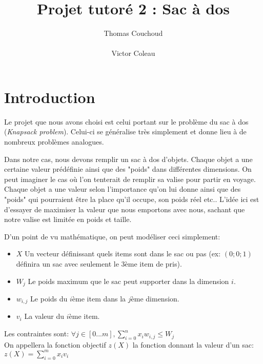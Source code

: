 \documentclass{EPUProjetPeiP}
\title[Projet sac à dos]{Projet tutoré 2 : Sac à dos}
\author{Thomas Couchoud\\
\noindent[\url{thomas.couchoud@etu.univ-tours.fr}]\\
Victor Coleau\\
\noindent[\url{victor.coleau@etu.univ-tours.fr}]}
\begin{document}
\maketitle

\setcounter{page}{0}
{
\setlength{\parskip}{0em}

\tableofcontents


}


\start

\chapter*{Introduction}
Le projet que nous avons choisi est celui portant sur le problème du sac à dos (\textit{Knapsack problem}). Celui-ci se généralise très simplement et donne lieu à de nombreux problèmes analogues.

Dans notre cas, nous devons remplir un sac à dos d'objets. Chaque objet a une certaine valeur prédéfinie ainsi que des "poids" dans différentes dimensions. On peut imaginer le cas où l'on tenterait de remplir sa valise pour partir en voyage. Chaque objet a une valeur selon l'importance qu'on lui donne ainsi que des "poids" qui pourraient être la place qu'il occupe, son poids réel etc.. L'idée ici est d'essayer de maximiser la valeur que nous emportons avec nous, sachant que notre valise est limitée en poids et taille.

D'un point de vu mathématique, on peut modéliser ceci simplement:
\begin{itemize}
	\item $X$ Un vecteur définissant quels items sont dans le sac ou pas (ex: $(0; 0; 1)$ définira un sac avec seulement le 3ème item de pris).
	\item $W_j$ Le poids maximum que le sac peut supporter dans la dimension $i$.
	\item $w_{i,j}$ Le poids du $i$ème item dans la $j$ème dimension.
	\item $v_i$ La valeur du $i$ème item.\\
\end{itemize}
Les contraintes sont: $\forall j\in [0...m], \sum_{i=0}^nx_iw_{i,j}\leq W_j$\\
On appellera la fonction objectif $z(X)$ la fonction donnant la valeur d'un sac: $z(X)=\sum_{i=0}^mx_iv_i$
\end{document}
